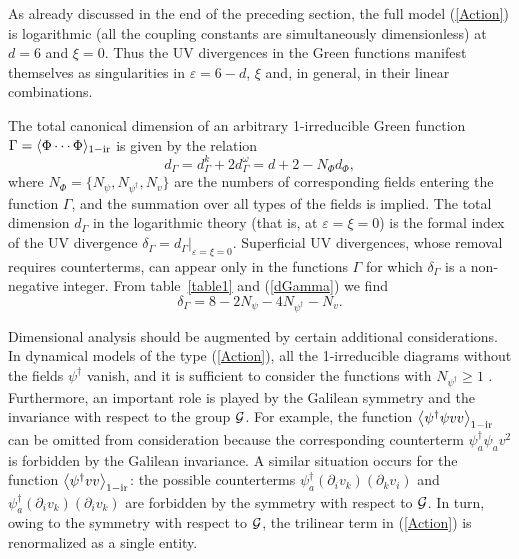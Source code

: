 \documentclass[12pt]{iopart}
\begin{document}
As already discussed in the end of the preceding section, the full
model (\ref{Action}) is logarithmic (all the coupling constants are
simultaneously dimensionless) at $d=6$ and $\xi=0$. Thus the UV
divergences in the Green functions manifest themselves as singularities
in $\varepsilon = 6-d$, $\xi$ and, in general, in their linear
combinations.

The total canonical dimension of an arbitrary 1-irreducible Green
function $\Gamma = \langle\Phi \cdots \Phi \rangle _{\rm 1-ir}$ is
given by the relation \cite{Book3}
\begin{equation}
d_{\Gamma }=d_{\Gamma }^k+2d_{\Gamma }^{\omega }= d+2-N_{\Phi
}d_{\Phi}, \label{dGamma}
\end{equation}
where $N_{\Phi}=\{N_{\psi},N_{\psi^{\dag}}, N_{v}\}$ are the
numbers of corresponding fields entering the function
$\Gamma$, and the summation over all types of the fields is
implied. The total dimension $d_{\Gamma}$ in the logarithmic theory
(that is, at $\varepsilon=\xi=0$) is the formal index of the UV
divergence $\delta_{\Gamma}=d_{\Gamma}|_{\varepsilon=\xi=0}$.
Superficial UV divergences, whose removal requires counterterms,
can appear only in the functions $\Gamma$ for which
$\delta_{\Gamma}$ is a non-negative integer.
From table~\ref{table1} and (\ref{dGamma}) we find
\begin{equation}
\delta_{\Gamma}= 8 - 2N_{\psi} - 4N_{\psi^{\dag}} - N_{v}.
\label{Inde}
\end{equation}


Dimensional analysis should be augmented by certain additional
considerations. In dynamical models of the type (\ref{Action}),
all the 1-irreducible diagrams without the fields
$\psi^{\dag}$ vanish, and it is sufficient to consider the
functions with $N_{\psi^{\dag}} \ge 1$ \cite{Book3}. Furthermore, an
important role is played by the Galilean symmetry and
the invariance  with respect to the group ${\cal G}$.
For example, the function
$\left\langle \psi^{\dag}\psi  vv\right\rangle_{\rm 1-ir}$ can be
omitted from consideration
because the corresponding counterterm $\psi^{\dag}_a\psi_a  v^2$
is forbidden by the Galilean invariance. A similar situation
occurs for the function $\left\langle \psi^{\dag} vv\right\rangle_{\rm 1-ir}$:
the possible counterterms
$\psi^{\dag}_a  (\partial_iv_k)(\partial_kv_i)$ and
$\psi^{\dag}_a  (\partial_iv_k)(\partial_i v_k)$
are forbidden by the symmetry with respect to ${\cal G}$.
In turn, owing to the symmetry with respect to ${\cal G}$, the
trilinear term in (\ref{Action}) is renormalized as a single entity.
\end{document}
